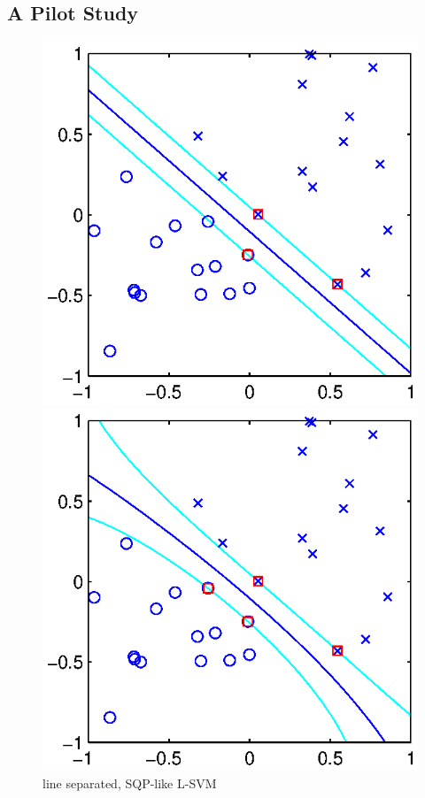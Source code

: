 \documentclass[11pt,a4paper]{article}
\theoremstyle{definition}
\begin{document}
    \subsection{A Pilot Study\label{Sec:PilotStu}}
      \begin{figure}[htbp]
        \centering
        \begin{minipage}[t]{0.24\linewidth}
          \centering
          \includegraphics[width=1\textwidth]{1linesqp.eps}
          \caption{\label{Fig:ex1_1}line separated, SQP-like L-SVM}
        \end{minipage}
        \begin{minipage}[t]{0.24\linewidth}
          \centering
          \includegraphics[width=1\textwidth]{1linechol.eps}

\end{minipage}
\end{figure}
\end{document}
